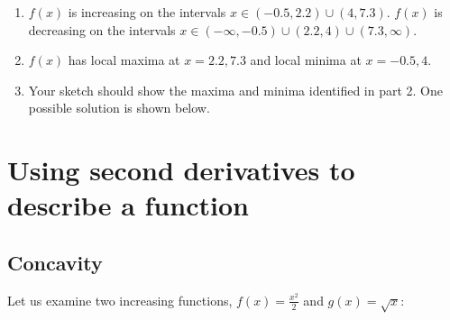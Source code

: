 \begin{Answer}
\begin{enumerate}
	\item $f(x)$ is increasing on the intervals $x\in (-0.5, 2.2)\cup(4, 7.3)$. 
	$f(x)$ is decreasing on the intervals $x\in (-\infty, -0.5)\cup(2.2, 4)\cup(
	7.3, \infty)$. 
	\item $f(x)$ has local maxima at $x = 2.2, 7.3$ and local minima at $x=-0.5, 
	4$. 
	\item Your sketch should show the maxima and minima identified in part 2. One 
	possible solution is shown below.
\end{enumerate}
\end{Answer}	

\section{Using second derivatives to describe a function}
\subsection{Concavity}
Let us examine two increasing functions, $f(x) = \frac{x^2}{2}$ and $g(x) = 
\sqrt{x}$:
\begin{figure}
\centering
{}
\end{figure}

